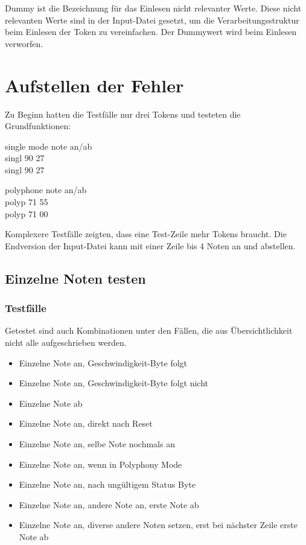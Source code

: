Dummy ist die Bezeichnung für das Einlesen nicht relevanter Werte. Diese nicht relevanten Werte sind in der Input-Datei gesetzt, um die Verarbeitungsstruktur beim Einlesen der Token zu vereinfachen. Der Dummywert wird beim Einlesen verworfen.
 
\section{Aufstellen der Fehler}\label{sec.testbench_fehler} 

Zu Beginn hatten die Testfälle nur drei Tokens und testeten die Grundfunktionen:

single mode note an/ab\\
singl 90 27\\ 
singl 90 27

polyphone note an/ab\\
polyp 71 55\\
polyp 71 00

Komplexere Testfälle zeigten, dass eine Test-Zeile mehr Tokens braucht. Die Endversion der Input-Datei kann mit einer Zeile bis 4 Noten an und abstellen.

\subsection{Einzelne Noten testen}
 
\subsubsection{Testfälle}

Getestet sind auch Kombinationen unter den Fällen, die aus Übersichtlichkeit nicht alle aufgeschrieben werden.

\begin{itemize}
\item Einzelne Note an, Geschwindigkeit-Byte folgt
\item Einzelne Note an, Geschwindigkeit-Byte folgt nicht
\item Einzelne Note ab
\item Einzelne Note an, direkt nach Reset
\item Einzelne Note an, selbe Note nochmals an
\item Einzelne Note an, wenn in Polyphony Mode
\item Einzelne Note an, nach ungültigem Status Byte
\item Einzelne Note an, andere Note an, erste Note ab
\item Einzelne Note an, diverse andere Noten setzen, erst bei nächster Zeile erste Note ab
\end{itemize}

